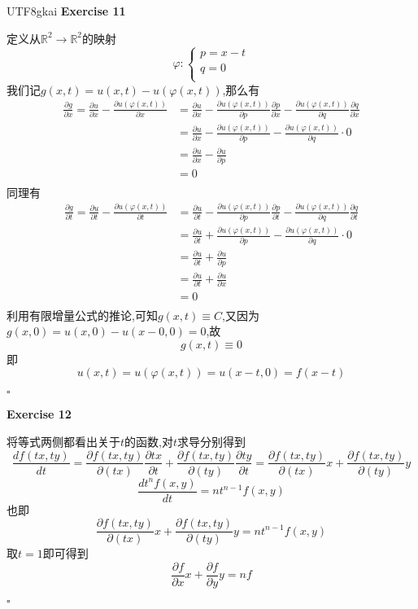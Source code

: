 \documentclass{article}
\newenvironment{exercise}[1]{%
{\textbf{Exercise #1} \\ 
    }
}{
  \hfill $\square$ 
  \par\bigskip 
}
\newcommand{\RR}{\mathbb{R}}
\begin{document}
\begin{CJK}{UTF8}{gkai}
\begin{exercise}{11}
    定义从$\RR^2\to\RR^2$的映射
    \[\varphi:\begin{cases}
        p = x - t\\
        q = 0\\
    \end{cases}\]
    我们记$g(x,t) = u(x,t) - u(\varphi(x,t))$,那么有
    \[
    \begin{aligned} 
        \frac{\partial g}{\partial x} = \frac{\partial u}{\partial x} - \frac{\partial u(\varphi(x,t))}{\partial x} &= \frac{\partial u}{\partial x} - \frac{\partial u(\varphi(x,t))}{\partial p} \frac{\partial p}{\partial x} - \frac{\partial u(\varphi(x,t))}{\partial q} \frac{\partial q}{\partial x}\\
        &= \frac{\partial u}{\partial x} - \frac{\partial u(\varphi(x,t))}{\partial p}  - \frac{\partial u(\varphi(x,t))}{\partial q} \cdot 0\\
        &= \frac{\partial u}{\partial x} - \frac{\partial u}{\partial p}\\
        &= 0\\
    \end{aligned}    
    \]
    同理有
    \[
        \begin{aligned} 
            \frac{\partial g}{\partial t} = \frac{\partial u}{\partial t} - \frac{\partial u(\varphi(x,t))}{\partial t} &= \frac{\partial u}{\partial t} - \frac{\partial u(\varphi(x,t))}{\partial p} \frac{\partial p}{\partial t} - \frac{\partial u(\varphi(x,t))}{\partial q} \frac{\partial q}{\partial t}\\
            &= \frac{\partial u}{\partial t} + \frac{\partial u(\varphi(x,t))}{\partial p}  - \frac{\partial u(\varphi(x,t))}{\partial q} \cdot 0\\
            &= \frac{\partial u}{\partial t} + \frac{\partial u}{\partial p}\\
            &= \frac{\partial u}{\partial t} + \frac{\partial u}{\partial x}\\
            &= 0\\
        \end{aligned}    
        \]
        利用有限增量公式的推论,可知$g(x,t) \equiv C$,又因为$g(x,0) = u(x,0) - u(x - 0,0) = 0$,故
        \[g(x,t) \equiv 0\]
        即
        \[u(x,t) = u(\varphi(x,t)) = u(x-t,0) = f(x-t)\]
\end{exercise}

\begin{exercise}{12}
    将等式两侧都看出关于$t$的函数,对$t$求导分别得到
    \[\frac{d f(tx,ty)}{d t} = \frac{\partial f(tx,ty)}{\partial (tx)} \frac{\partial tx}{\partial t} + \frac{\partial f(tx,ty)}{\partial (ty)} \frac{\partial ty}{\partial t} = \frac{\partial f(tx,ty)}{\partial (tx)} x + \frac{\partial f(tx,ty)}{\partial (ty)} y\]
    \[\frac{d t^n f(x,y)}{d t} = n t^{n - 1} f(x,y)\]
    也即
    \[\frac{\partial f(tx,ty)}{\partial (tx)} x + \frac{\partial f(tx,ty)}{\partial (ty)} y = n t^{n - 1} f(x,y)\]
    取$t = 1$即可得到
    \[\frac{\partial f}{\partial x} x + \frac{\partial f}{\partial y} y = n f\]
\end{exercise}


\end{CJK}
\end{document}
